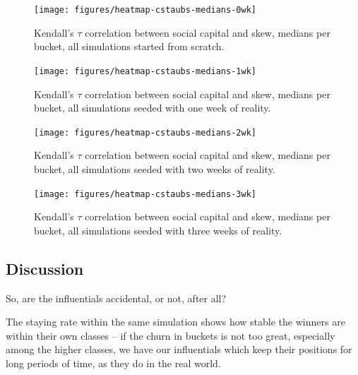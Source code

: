 \documentclass[10pt,oneside]{memoir}
\begin{document}
\begin{Spacing}{2}
\begin{figure}
\begin{center}
    \texttt{[image: figures/heatmap-cstaubs-medians-0wk]}
    \caption{Kendall’s $\tau$ correlation between social capital and skew, medians per bucket, all simulations started from scratch.}
    \label{figure:heatmap-cstaubs-0wk}
\end{center}
\end{figure}

\begin{figure}
\begin{center}
    \texttt{[image: figures/heatmap-cstaubs-medians-1wk]}
    \caption{Kendall’s $\tau$ correlation between social capital and skew, medians per bucket, all simulations seeded with one week of reality.}
    \label{figure:heatmap-cstaubs-1wk}
\end{center}
\end{figure}

\begin{figure}
\begin{center}
    \texttt{[image: figures/heatmap-cstaubs-medians-2wk]}
    \caption{Kendall’s $\tau$ correlation between social capital and skew, medians per bucket, all simulations seeded with two weeks of reality.}
    \label{figure:heatmap-cstaubs-2wk}
\end{center}
\end{figure}

\begin{figure}
\begin{center}
    \texttt{[image: figures/heatmap-cstaubs-medians-3wk]}
    \caption{Kendall’s $\tau$ correlation between social capital and skew, medians per bucket, all simulations seeded with three weeks of reality.}
    \label{figure:heatmap-cstaubs-3wk}
\end{center}
\end{figure}
\pagebreak \subsection{Discussion}
\label{discussion}

\label{section:discussion}
So, are the influentials accidental, or not, after all?


The staying rate within the same simulation shows how stable the winners are within their own classes -- if the churn in buckets is not too great, especially among the higher classes, we have our influentials which keep their positions for long periods of time, as they do in the real world.



\end{Spacing}
\end{document}
